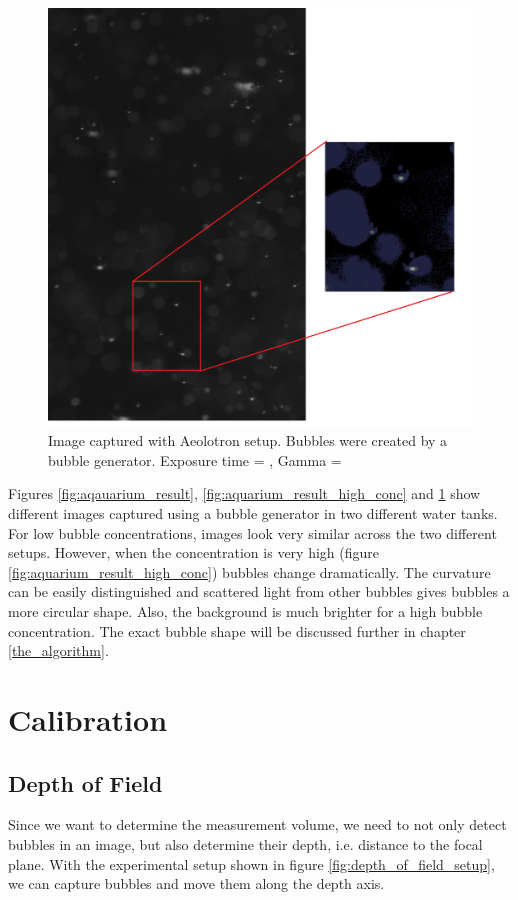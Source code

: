 			\begin{figure}
				\centering
				\includegraphics[scale=0.3]{images/aeolotron_result.png}
				\caption{Image captured with Aeolotron setup. Bubbles were created by a bubble generator.  Exposure time = , Gamma = }
								
				\label{fig:aeolotron_result}
			\end{figure}

			Figures \ref{fig:aqauarium_result}, \ref{fig:aquarium_result_high_conc} and \ref{fig:aeolotron_result} show different images captured using a bubble generator in two different water tanks. For low bubble concentrations, images look very similar across the two different setups. However, when the concentration is very high (figure \ref{fig:aquarium_result_high_conc}) bubbles change dramatically. The curvature can be easily distinguished and scattered light from other bubbles gives bubbles a more circular shape. Also, the background is much brighter for a high bubble concentration. The exact bubble shape will be discussed further in chapter \ref{the_algorithm}.	
	
	
	\section{Calibration}\label{calibration_setup}
		\subsection{Depth of Field}\label{sub:depth_of_field_setup}
			Since we want to determine the measurement volume, we need to not only detect bubbles in an image, but also determine their depth, i.e. distance to the focal plane. With the experimental setup shown in figure \ref{fig:depth_of_field_setup}, we can capture bubbles and move them along the depth axis. 
			
